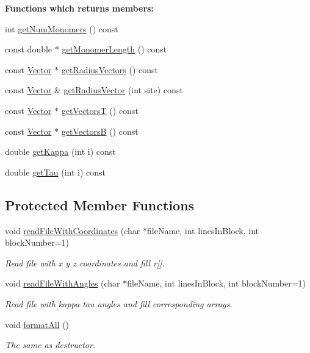 \begin{Indent}{\bf Functions which returns members\+:}\par
\begin{DoxyCompactItemize}
\item 
int \hyperlink{class_p_c_a_1_1_polymer_a5c87b083f77c06ffd14278f87dad47ea}{get\+Num\+Monomers} () const
\item 
const double $\ast$ \hyperlink{class_p_c_a_1_1_polymer_af05e598bcd1e9987aca46d0661ac6dca}{get\+Monomer\+Length} () const
\item 
const \hyperlink{class_p_c_a_1_1_vector}{Vector} $\ast$ \hyperlink{class_p_c_a_1_1_polymer_a6e913f9b50a164c828f9a3cb89e452e1}{get\+Radius\+Vectors} () const
\item 
const \hyperlink{class_p_c_a_1_1_vector}{Vector} \& \hyperlink{class_p_c_a_1_1_polymer_ab2ea86763e0f0be646ef6aa6a105f927}{get\+Radius\+Vector} (int site) const
\item 
const \hyperlink{class_p_c_a_1_1_vector}{Vector} $\ast$ \hyperlink{class_p_c_a_1_1_polymer_a83c92fb07eafc88d121ef4b4124319c3}{get\+VectorsT} () const
\item 
const \hyperlink{class_p_c_a_1_1_vector}{Vector} $\ast$ \hyperlink{class_p_c_a_1_1_polymer_a4a90f901ceb688b0d96b126cc2ba3678}{get\+VectorsB} () const
\item 
double \hyperlink{class_p_c_a_1_1_polymer_ac0cafb89b662aaa3be2bbc7bf034d410}{get\+Kappa} (int i) const
\item 
double \hyperlink{class_p_c_a_1_1_polymer_a01b636d898a08113ca9bf556447934ec}{get\+Tau} (int i) const
\end{DoxyCompactItemize}
\end{Indent}
\subsection*{Protected Member Functions}
\begin{DoxyCompactItemize}
\item 
void \hyperlink{class_p_c_a_1_1_polymer_a777691bb321ef1da30a064757eb480c7}{read\+File\+With\+Coordinates} (char $\ast$file\+Name, int lines\+In\+Block, int block\+Number=1)
\begin{DoxyCompactList}\small\item\em Read file with x y z coordinates and fill r\mbox{[}\mbox{]}. \end{DoxyCompactList}\item 
void \hyperlink{class_p_c_a_1_1_polymer_a3e498b6e57d98c9cc4d07a7aedb4b6a5}{read\+File\+With\+Angles} (char $\ast$file\+Name, int lines\+In\+Block, int block\+Number=1)
\begin{DoxyCompactList}\small\item\em Read file with kappa tau angles and fill corresponding arrays. \end{DoxyCompactList}\item 
void \hyperlink{class_p_c_a_1_1_polymer_a3fcca4084a54ac8bc1941b36462bc560}{format\+All} ()
\begin{DoxyCompactList}\small\item\em The same as destructor. \end{DoxyCompactList}\end{DoxyCompactItemize}
